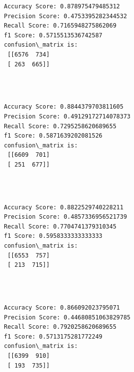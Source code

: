 \documentclass[11pt]{article}
\begin{document}
    \begin{Verbatim}[commandchars=\\\{\}]
Accuracy Score: 0.878975479485312
Precision Score: 0.4753395282344532
Recall Score: 0.7165948275862069
f1 Score: 0.5715513536742587
confusion\_matrix is: 
 [[6576  734]
 [ 263  665]] 


    \end{Verbatim}

   

    \begin{center}
    \end{center}
    { \hspace*{\fill} \\}
    
    \begin{Verbatim}[commandchars=\\\{\}]
Accuracy Score: 0.8844379703811605
Precision Score: 0.49129172714078373
Recall Score: 0.7295258620689655
f1 Score: 0.5871639202081526
confusion\_matrix is: 
 [[6609  701]
 [ 251  677]] 


    \end{Verbatim}

  

    \begin{center}
    \end{center}
    { \hspace*{\fill} \\}
    
    \begin{Verbatim}[commandchars=\\\{\}]
Accuracy Score: 0.8822529740228211
Precision Score: 0.4857336956521739
Recall Score: 0.7704741379310345
f1 Score: 0.5958333333333333
confusion\_matrix is: 
 [[6553  757]
 [ 213  715]] 


    \end{Verbatim}

   

    \begin{center}
    \end{center}
    { \hspace*{\fill} \\}
    
    \begin{Verbatim}[commandchars=\\\{\}]
Accuracy Score: 0.866092023795071
Precision Score: 0.44680851063829785
Recall Score: 0.7920258620689655
f1 Score: 0.5713175281772249
confusion\_matrix is: 
 [[6399  910]
 [ 193  735]] 


    \end{Verbatim}
\end{document}
